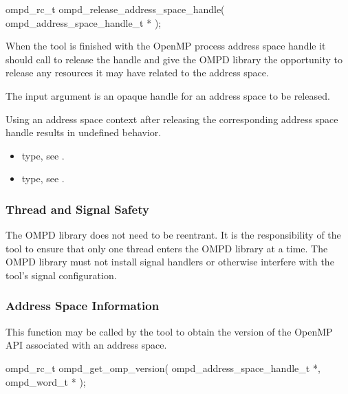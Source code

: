 \format

\begin{cspecific}
\begin{ompSyntax}
ompd_rc_t ompd_release_address_space_handle(
  ompd_address_space_handle_t *
);
\end{ompSyntax}
\end{cspecific}


\descr
When the tool is finished with the OpenMP process address space handle it
should call  to release
the handle and give the OMPD library the opportunity to release
any resources it may have related to the address space.

\argdesc
The input argument  is an opaque handle for an address space
to be released.

\restrictions
Using an address space context after releasing the corresponding address space handle results in undefined behavior.

\crossreferences
\begin{itemize}
	\item {} type, see .
	\item {} type, see .
\end{itemize}

\subsubsection{Thread and Signal Safety}

The OMPD library does not need to be reentrant. It is the responsibility
of the tool to ensure that only one thread enters the OMPD library at a time.
The OMPD library must not install signal handlers or otherwise interfere with the tool's signal
configuration.


\subsubsection{Address Space Information}

\label{subsubsubsec:ompd_get_omp_version}

\summary
This function may be called by the tool to obtain the version of the OpenMP
API associated with an address space.

\format

\begin{cspecific}
\begin{ompSyntax}
ompd_rc_t ompd_get_omp_version(
  ompd_address_space_handle_t *,
  ompd_word_t *
);
\end{ompSyntax}
\end{cspecific}

